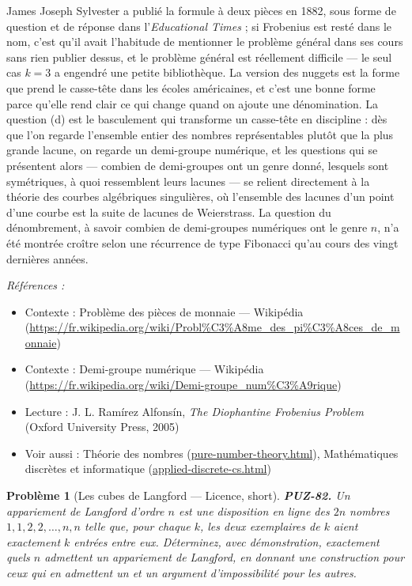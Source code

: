 \documentclass[11pt]{article}
\newtheorem{problem}{Problème}
\newenvironment{refs}{\par\small\noindent\emph{Références :}\begin{itemize}\setlength\itemsep{0pt}}{\end{itemize}\normalsize}
\begin{document}
\noindent James Joseph Sylvester a publié la formule à deux pièces en 1882, sous
forme de question et de réponse dans l'\textit{Educational Times} ; si Frobenius est resté dans
le nom, c'est qu'il avait l'habitude de mentionner le problème général dans ses cours sans
rien publier dessus, et le problème général est réellement difficile --- le seul cas
$ k = 3 $ a engendré une petite bibliothèque. La version des nuggets est la forme que
prend le casse-tête dans les écoles américaines, et c'est une bonne forme parce qu'elle rend
clair ce qui change quand on ajoute une dénomination. La question (d) est le basculement qui
transforme un casse-tête en discipline : dès que l'on regarde l'ensemble entier des nombres
représentables plutôt que la plus grande lacune, on regarde un demi-groupe numérique, et les
questions qui se présentent alors --- combien de demi-groupes ont un genre donné, lesquels sont
symétriques, à quoi ressemblent leurs lacunes --- se relient directement à la théorie des
courbes algébriques singulières, où l'ensemble des lacunes d'un point d'une courbe est la
suite de lacunes de Weierstrass. La question du dénombrement, à savoir combien de
demi-groupes numériques ont le genre $ n $, n'a été montrée croître selon une récurrence de
type Fibonacci qu'au cours des vingt dernières années.

\begin{refs}
\item Contexte : Problème des pièces de monnaie --- Wikipédia (\url{https://fr.wikipedia.org/wiki/Probl%C3%A8me_des_pi%C3%A8ces_de_monnaie})
\item Contexte : Demi-groupe numérique --- Wikipédia (\url{https://fr.wikipedia.org/wiki/Demi-groupe_num%C3%A9rique})
\item Lecture : J. L. Ramírez Alfonsín, \textit{The Diophantine Frobenius Problem} (Oxford University Press, 2005)
\item Voir aussi : Théorie des nombres (\url{pure-number-theory.html}), Mathématiques discrètes et informatique (\url{applied-discrete-cs.html})
\end{refs}

\bigskip

\begin{problem}[{Les cubes de Langford --- Licence, short}]
\textbf{PUZ-82.} Un \textit{appariement de Langford} d'ordre $ n $ est
une disposition en ligne des $ 2n $ nombres $ 1,1,2,2,\dots,n,n $ telle que, pour chaque
$ k $, les deux exemplaires de $ k $ aient exactement $ k $ entrées entre eux.
Déterminez, avec démonstration, exactement quels $ n $ admettent un appariement de
Langford, en donnant une construction pour ceux qui en admettent un et un argument
d'impossibilité pour les autres.
\end{problem}
\end{document}
